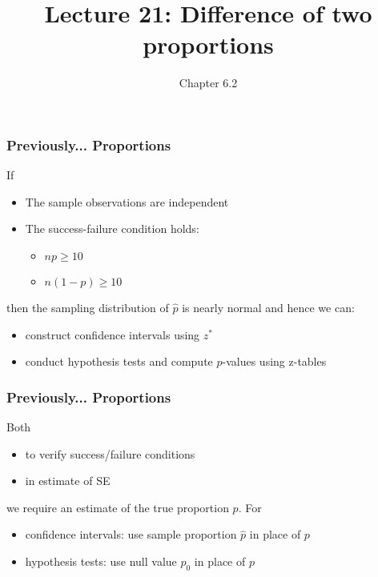 \documentclass[handout]{beamer}
\title{Lecture 21: Difference of two proportions}
\author{Chapter 6.2}
\date{}
\newcommand{\blue}[1]{\textcolor{blue2}{#1}}
\newcommand{\phat}{\widehat{p}}
\begin{document}
\begin{frame}
\titlepage
\end{frame}


\begin{frame}
\frametitle{Previously... Proportions}

If
\begin{itemize}
\pause\item The sample observations are independent
\pause\item The \blue{success-failure condition} holds:
\begin{itemize}
\item $np \geq 10$
\item $n(1-p) \geq 10$ 
\end{itemize}
\end{itemize}
\pause then the sampling distribution of $\phat$ is nearly normal and hence we can:
\begin{itemize}
\item construct confidence intervals using $z^*$
\item conduct hypothesis tests and compute $p$-values using z-tables
\end{itemize}

\end{frame}


\begin{frame}
\frametitle{Previously... Proportions}

Both
\begin{itemize}
\pause\item to verify success/failure conditions
\pause\item in estimate of SE
\end{itemize}
we require an estimate of the true proportion $p$.  For
\begin{itemize}
\pause\item confidence intervals: use \blue{sample proportion $\phat$} in place of $p$
\pause\item hypothesis tests: use \blue{null value $p_0$} in place of $p$
\end{itemize}

\end{frame}
\end{document}
